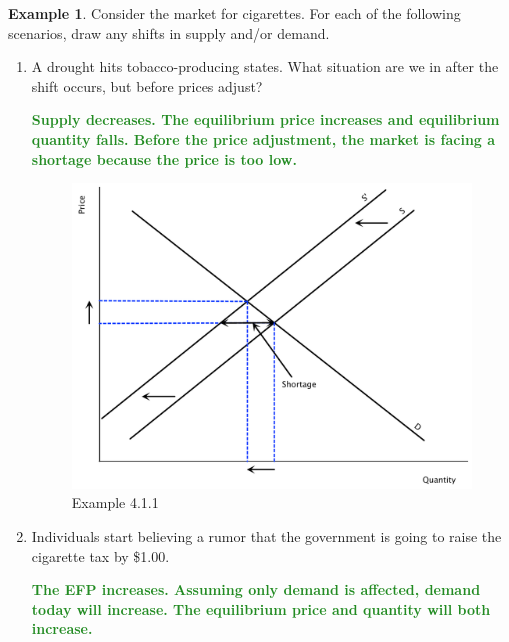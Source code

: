 \documentclass[11pt]{article}\usepackage[]{graphicx}\usepackage[]{color}
\theoremstyle{definition}
\newtheorem{exmp}{Example}[section]
\newcommand{\ddp}[1]{{\textbf{\textcolor{ForestGreen}{#1}}}}
\begin{document}
		\begin{exmp}	Consider the market for cigarettes. For each of the following scenarios, draw any shifts in supply and/or demand.
		\begin{enumerate}
		
	
		\item	A drought hits tobacco-producing states. What situation are we in after the shift occurs, but before prices adjust?
		
		\ddp{Supply decreases. The equilibrium price increases and equilibrium quantity falls. Before the price adjustment, the market is facing a shortage because the price is too low.}
		
			\begin{figure}[H]
				\centering
				\includegraphics[scale=.30]{plot14.pdf}
				\caption{Example 4.1.1}
			\end{figure}
			

		\item 	Individuals start believing a rumor that the government is going to raise the cigarette tax by \$1.00.
		
		\ddp{The EFP increases. Assuming only demand is affected, demand today will increase. The equilibrium price and quantity will both increase.}
	

\end{enumerate}
\end{exmp}
\end{document}
